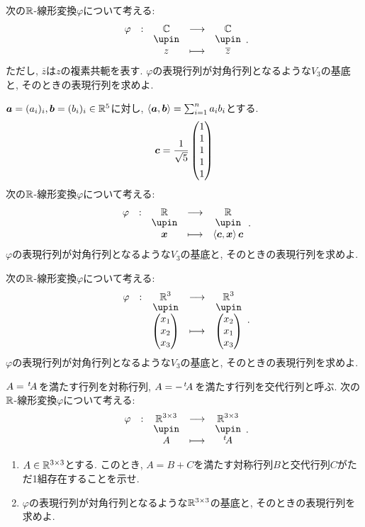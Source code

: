 \begin{quiz}
  次の$\mathbb{R}$-線形変換$\varphi$について考える:
  \begin{align*}
    \shazo{\varphi}{\CC}{\CC}
    {z}{\overline{z}}.
  \end{align*}
  ただし, $\overline{z}$は$z$の複素共軛を表す.
  $\varphi$の表現行列が対角行列となるような$V_3$の基底と,
  そのときの表現行列を求めよ.
\end{quiz}

\begin{quiz}
  $\boldsymbol{a}=(a_i)_{i}, \boldsymbol{b}=(b_i)_i \in \mathbb{R}^5$に対し,
  $\Braket{\boldsymbol{a},\boldsymbol{b}}=\sum_{i=1}^na_ib_i$とする.
  \begin{align*}
    \boldsymbol{c}=\frac{1}{\sqrt 5}\begin{pmatrix}1\\1\\1\\1\\1\end{pmatrix}
  \end{align*}  
  次の$\mathbb{R}$-線形変換$\varphi$について考える:
  \begin{align*}
    \shazo{\varphi}{\RR}{\RR}
    {\xx}{\Braket{\ccc,\xx}\ccc}.
  \end{align*}
  $\varphi$の表現行列が対角行列となるような$V_3$の基底と,
  そのときの表現行列を求めよ.
\end{quiz}


\begin{quiz}
  次の$\mathbb{R}$-線形変換$\varphi$について考える:
  \begin{align*}
    \shazo{\varphi}{\RR^3}{\RR^3}
    {\begin{pmatrix}x_1\\x_2\\x_3\end{pmatrix}}{\begin{pmatrix}x_2\\x_1\\x_3\end{pmatrix}}.
  \end{align*}
  $\varphi$の表現行列が対角行列となるような$V_3$の基底と,
  そのときの表現行列を求めよ.
\end{quiz}

\begin{quiz}
  $A={\left.^{t}\!A\right.}$を満たす行列を対称行列,
  $A=-{\left.^{t}\!A\right.}$を満たす行列を交代行列と呼ぶ.
  次の$\mathbb{R}$-線形変換$\varphi$について考える:
  \begin{align*}
    \shazo{\varphi}{\RR^{3\times 3}}{\RR^{3\times 3}}
    {A}{\transposed{A}}.
  \end{align*}
  \begin{enumerate}
  \item $A\in \mathbb{R}^{3\times 3}$とする. このとき, $A=B+C$を満たす対称行列$B$と交代行列$C$がただ1組存在することを示せ.
  \item
      $\varphi$の表現行列が対角行列となるような$\mathbb{R}^{3\times 3}$の基底と,
  そのときの表現行列を求めよ.
  \end{enumerate}

\end{quiz}


